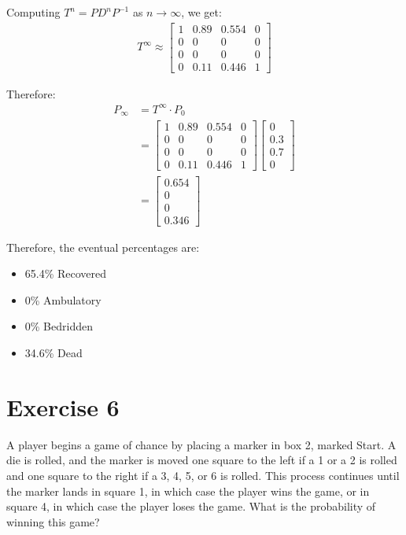 \documentclass{article}
\begin{document}
Computing $T^n = PD^nP^{-1}$ as $n \to \infty$, we get:
\begin{align*}
T^\infty \approx 
\begin{bmatrix}
1 & 0.89 & 0.554 & 0 \\
0 & 0 & 0 & 0 \\
0 & 0 & 0 & 0 \\
0 & 0.11 & 0.446 & 1
\end{bmatrix}
\end{align*}

Therefore:
\begin{align*}
P_\infty &= T^\infty \cdot P_0 \\
&= 
\begin{bmatrix}
1 & 0.89 & 0.554 & 0 \\
0 & 0 & 0 & 0 \\
0 & 0 & 0 & 0 \\
0 & 0.11 & 0.446 & 1
\end{bmatrix}
\begin{bmatrix}
0 \\
0.3 \\
0.7 \\
0
\end{bmatrix} \\
&= 
\begin{bmatrix}
0.654 \\
0 \\
0 \\
0.346
\end{bmatrix}
\end{align*}

Therefore, the eventual percentages are:
\begin{itemize}
    \item 65.4\% Recovered
    \item 0\% Ambulatory
    \item 0\% Bedridden
    \item 34.6\% Dead
\end{itemize}

\newpage

\section*{Exercise 6}
A player begins a game of chance by placing a marker in box 2, marked Start. A die is rolled, and the marker is moved one square to the left if a 1 or a 2 is rolled and one square to the right if a 3, 4, 5, or 6 is rolled. This process continues until the marker lands in square 1, in which case the player wins the game, or in square 4, in which case the player loses the game. What is the probability of winning this game?
\end{document}
